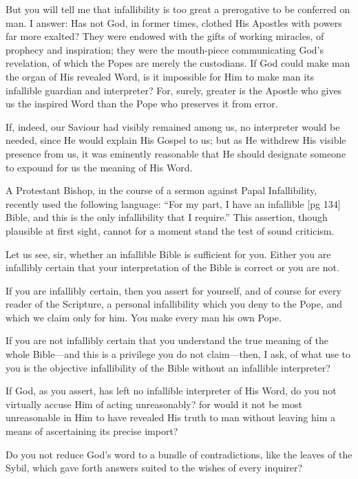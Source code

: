 But you will tell me that infallibility is too
great a prerogative to be conferred on man. I
answer: Has not God, in former times, clothed
His Apostles with powers far more exalted? They
were endowed with the gifts of working miracles,
of prophecy and inspiration; they were the mouth-piece
communicating God's revelation, of which
the Popes are merely the custodians. If God could
make man the organ of His revealed Word, is it
impossible for Him to make man its infallible guardian
and interpreter? For, surely, greater is the
Apostle who gives us the inspired Word than the
Pope who preserves it from error.

If, indeed, our Saviour had visibly remained
among us, no interpreter would be needed, since
He would explain His Gospel to us; but as He withdrew
His visible presence from us, it was eminently
reasonable that He should designate someone to
expound for us the meaning of His Word.

A Protestant Bishop, in the course of a sermon
against Papal Infallibility, recently used the following
language: “For my part, I have an infallible
[pg 134]
Bible, and this is the only infallibility that
I require.” This assertion, though plausible at
first sight, cannot for a moment stand the test of
sound criticism.

Let us see, sir, whether an infallible Bible is
sufficient for you. Either you are infallibly certain
that your interpretation of the Bible is correct
or you are not.

If you are infallibly certain, then you assert
for yourself, and of course for every reader of the
Scripture, a personal infallibility which you deny
to the Pope, and which we claim only for him.
You make every man his own Pope.

If you are not infallibly certain that you understand
the true meaning of the whole Bible—and
this is a privilege you do not claim—then, I ask,
of what use to you is the objective infallibility of
the Bible without an infallible interpreter?

If God, as you assert, has left no infallible interpreter
of His Word, do you not virtually accuse
Him of acting unreasonably? for would it not be
most unreasonable in Him to have revealed His
truth to man without leaving him a means of ascertaining
its precise import?

Do you not reduce God's word to a bundle of
contradictions, like the leaves of the Sybil, which
gave forth answers suited to the wishes of every
inquirer?

